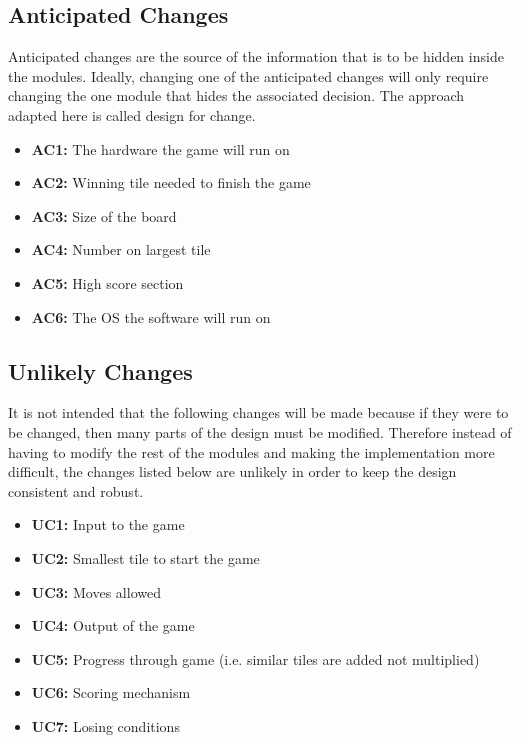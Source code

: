 \documentclass[12pt]{article}
\begin{document}
\subsection{Anticipated Changes}
Anticipated changes are the source of the information that is to be hidden inside the modules.
Ideally, changing one of the anticipated changes will only require changing the one module
that hides the associated decision. The approach adapted here is called design for change.
\begin{itemize}
\item \textbf{AC1:} The hardware the game will run on
\item \textbf{AC2:} Winning tile needed to finish the game
\item \textbf{AC3:} Size of the board
\item \textbf{AC4:} Number on largest tile
\item \textbf{AC5:} High score section
\item \textbf{AC6:} The OS the software will run on
\end{itemize}

\subsection{Unlikely Changes}
It is not intended that the following changes will be made because if they were to be changed, then many parts of the design must be modified. Therefore instead of having to modify the rest of the modules and making the implementation more difficult, the changes listed below are unlikely in order to keep the design consistent and robust. 
\begin{itemize}
\item \textbf{UC1:} Input to the game
\item \textbf{UC2:} Smallest tile to start the game
\item \textbf{UC3:} Moves allowed
\item \textbf{UC4:} Output of the game
\item \textbf{UC5:} Progress through game (i.e. similar tiles are added not multiplied)
\item \textbf{UC6:} Scoring mechanism
\item \textbf{UC7:}  Losing conditions 
\end{itemize} 
\end{document}
